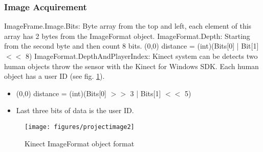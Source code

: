 \subsubsection{Image Acquirement}
ImageFrame.Image.Bits: Byte array from the top and left, each element of this array has 2
bytes from the ImageFormat object.
ImageFormat.Depth: Starting from the second byte and then count 8 bits. (0,0) distance =
(int)(Bits[0] | Bit[1] $<<$ 8)
ImageFormat.DepthAndPlayerIndex: Kinect system can be detects two human objects throw
the sensor with the Kinect for Windows SDK. Each human object has a user ID (see fig. \ref{fig:humobject}).
\begin{itemize}
\item (0,0) distance = (int)(Bits[0] $>>$ 3 | Bits[1] $<<$ 5)
\item Last three bits of data is the user ID.
\end{itemize}

\begin{figure}[hbt]
  \center
        \texttt{[image: figures/projectimage2]}
        \caption{Kinect ImageFormat object format}
  \label{fig:humobject}
\end{figure}
